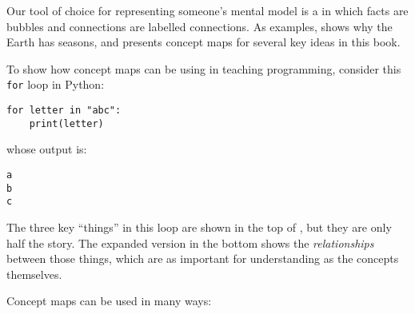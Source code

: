 
Our tool of choice for representing someone's mental model is a 
in which facts are bubbles and connections are labelled connections.
As examples,
 shows why the Earth has seasons,
and  presents concept maps for several key ideas in this book.


To show how concept maps can be using in teaching programming, consider this \texttt{for} loop in Python:

\begin{verbatim}
for letter in "abc":
    print(letter)
\end{verbatim}

whose output is:

\begin{verbatim}
a
b
c
\end{verbatim}

The three key ``things'' in this loop are shown in the top of , but they are only half the story.
The expanded version in the bottom shows the \emph{relationships} between those things,
which are as important for understanding as the concepts themselves.


Concept maps can be used in many ways:

